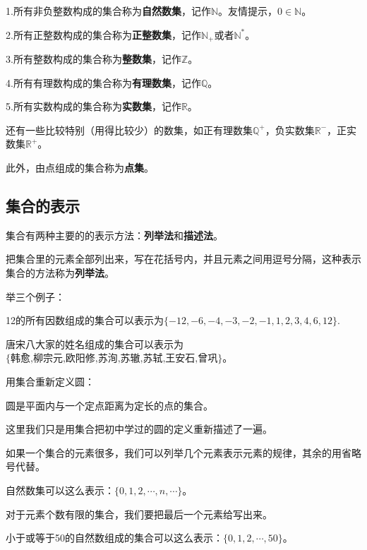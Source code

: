 \documentclass[lang=cn,math=cm,chinesefont=nofont,11pt,scheme=chinese,twocol]{elegantbook}
\begin{document}
1.所有非负整数构成的集合称为\textbf{自然数集}，记作$\mathbb{N}$。友情提示，$0\in \mathbb{N}$。

2.所有正整数构成的集合称为\textbf{正整数集}，记作$\mathbb{N}_+$或者$\mathbb{N}^*$。

3.所有整数构成的集合称为\textbf{整数集}，记作$\mathbb{Z}$。

4.所有有理数构成的集合称为\textbf{有理数集}，记作$\mathbb{Q}$。

5.所有实数构成的集合称为\textbf{实数集}，记作$\mathbb{R}$。

还有一些比较特别（用得比较少）的数集，如正有理数集$\mathbb{Q}^+$，负实数集$\mathbb{R}^-$，正实数集$\mathbb{R}^+$。

此外，由点组成的集合称为\textbf{点集}。

\subsection{集合的表示}
集合有两种主要的的表示方法：\textbf{列举法}和\textbf{描述法}。

把集合里的元素全部列出来，写在花括号内，并且元素之间用逗号分隔，这种表示集合的方法称为\textbf{列举法}。

举三个例子：

\begin{example}
  12的所有因数组成的集合可以表示为$\{-12,-6,-4,-3,-2,-1,1,2,3,4,6,12\}$.
\end{example}
\begin{example}
  唐宋八大家的姓名组成的集合可以表示为$\{\text{韩愈,柳宗元,欧阳修,苏洵,苏辙,苏轼,王安石,曾巩}\}$。
\end{example}
\begin{example}
  用集合重新定义圆：
\end{example}
\begin{definition}[圆]
  圆是平面内与一个定点距离为定长的点的集合。
\end{definition}
这里我们只是用集合把初中学过的圆的定义重新描述了一遍。

如果一个集合的元素很多，我们可以列举几个元素表示元素的规律，其余的用省略号代替。

\begin{example}
  自然数集可以这么表示：$\{0,1,2,\cdots,n,\cdots\}$。
\end{example}

对于元素个数有限的集合，我们要把最后一个元素给写出来。
\begin{example}
  小于或等于50的自然数组成的集合可以这么表示：$\{0,1,2,\cdots,50\}$。
\end{example}
\end{document}
